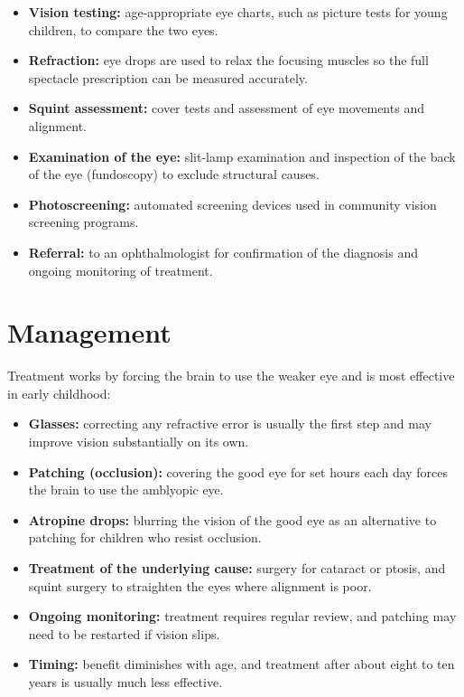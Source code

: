 \begin{itemize}
    \item \textbf{Vision testing:} age-appropriate eye charts, such as picture tests for young children, to compare the two eyes.
    \item \textbf{Refraction:} eye drops are used to relax the focusing muscles so the full spectacle prescription can be measured accurately.
    \item \textbf{Squint assessment:} cover tests and assessment of eye movements and alignment.
    \item \textbf{Examination of the eye:} slit-lamp examination and inspection of the back of the eye (fundoscopy) to exclude structural causes.
    \item \textbf{Photoscreening:} automated screening devices used in community vision screening programs.
    \item \textbf{Referral:} to an ophthalmologist for confirmation of the diagnosis and ongoing monitoring of treatment.
\end{itemize}

\section*{Management}
Treatment works by forcing the brain to use the weaker eye and is most effective in early childhood:

\begin{itemize}
    \item \textbf{Glasses:} correcting any refractive error is usually the first step and may improve vision substantially on its own.
    \item \textbf{Patching (occlusion):} covering the good eye for set hours each day forces the brain to use the amblyopic eye.
    \item \textbf{Atropine drops:} blurring the vision of the good eye as an alternative to patching for children who resist occlusion.
    \item \textbf{Treatment of the underlying cause:} surgery for cataract or ptosis, and squint surgery to straighten the eyes where alignment is poor.
    \item \textbf{Ongoing monitoring:} treatment requires regular review, and patching may need to be restarted if vision slips.
    \item \textbf{Timing:} benefit diminishes with age, and treatment after about eight to ten years is usually much less effective.
\end{itemize}

